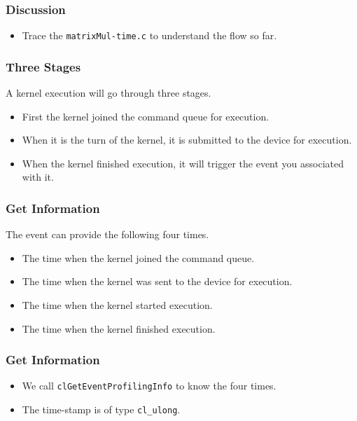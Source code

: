 \documentclass{beamer}
\begin{document}
\begin{frame}
\end{frame}

\begin{frame}
  \frametitle{Discussion}
  \begin{itemize}
    \item Trace the {\tt matrixMul-time.c} to understand the flow so far.
  \end{itemize}
\end{frame}

\begin{frame}
  \frametitle{Three Stages}
  A kernel execution will go through three stages.
  \begin{itemize}
    \item First the kernel joined the command queue for execution.
    \item When it is the turn of the kernel, it is submitted to the
      device for execution.
    \item When the kernel finished execution, it will trigger the
      event you associated with it.
  \end{itemize}
\end{frame}

\begin{frame}
  \frametitle{Get Information}
  The event can provide the following four times.
  \begin{itemize}
    \item The time when the kernel joined the command queue.
    \item The time when the kernel was sent to the device for execution.
    \item The time when the kernel started execution.
    \item The time when the kernel finished execution.
  \end{itemize}
\end{frame}

\begin{frame}
  \frametitle{Get Information}
  \begin{itemize}
    \item We call {\tt clGetEventProfilingInfo} to know the four
      times.
    \item The time-stamp is of type {\tt cl\_ulong}.
  \end{itemize}
\end{frame}
\end{document}
